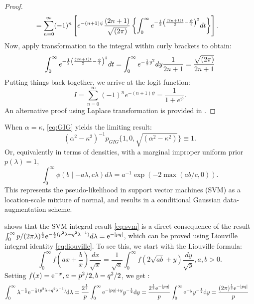 \documentclass[lineno]{biometrika}
\begin{document}
\begin{proof}
\begin{align*}
& = \sum_{n=0}^{\infty} (-1)^n \left[  e^{-(n+1)\psi} \frac{(2n+1)}{\sqrt{(2\pi)}} \left\{ \int_{0}^{\infty}e^{-\frac{1}{2} \left( \frac{(2n+1)t}{2} - \frac{\psi}{t}\right)^2 } dt \right\} \right].
\end{align*}
Now, apply \CS transformation to the integral within curly brackets to obtain: 
$$ 
\int_{0}^{\infty}e^{-\frac{1}{2} \left( \frac{(2n+1)t}{2} - \frac{\psi}{t}\right)^2 } dt = \int_0^{\infty} e^{-\frac{1}{2} y^2} dy \frac{1}{2n+1} = \frac{\sqrt{(2\pi)}}{2n+1}
$$
Putting things back together, we arrive at the logit function: 
$$
I = \sum_{n=0}^{\infty} (-1)^n e^{-(n+1)\psi} = \frac{1}{1+e^{\psi}}.
$$
An alternative proof using Laplace transformation is provided in \cite{polson2013bayesian}. 
\end{proof}
\begin{remark}
When $\alpha = \kappa$, \eqref{eq:GIG} yields the limiting result: 
$$
(\alpha^2-\kappa^2)^{-1}p_{GIG}\{ 1,0,\sqrt{(\alpha^2-\kappa^2)} \} \equiv 1.
$$
Or, equivalently in terms of densities, with a marginal improper uniform prior $p(\lambda) = 1$,
\begin{equation}
  \int_{0}^{\infty} \phi(b \mid -a\lambda, c\lambda) d\lambda = a^{-1} \exp(-2 \max(ab/c,0)). \label{eq:svm}
\end{equation}
This represents the pseudo-likelihood in support vector machines (SVM) as a location-scale mixture of normal, and results in a conditional Gaussian data-augmentation scheme. 
\end{remark}
\citet{polson2011data} shows that the SVM integral result \eqref{eq:svm} is a direct consequence of the \citet{andrews1974scale} result $\int_0^{\infty} p/(2\pi \lambda)^{\frac{1}{2}} {\rm e}^{-\frac{1}{2} (p^2 \lambda+q^2 \lambda^{-1})} d\lambda = {\rm e}^{-|pq|}$, which can be proved using Liouville integral identity \eqref{eq:liouville}. To see this, we start with the Liouville formula:
$$
\int_{0}^{\infty} f\left(ax + \frac{b}{x} \right) \frac{dx}{\sqrt{x}} = \frac{1}{\sqrt{a}} \int_{0}^{\infty} f \left( 2\sqrt{ab} + y \right) \frac{dy}{\sqrt{y}}, a,b >0. 
$$
Setting $f(x) = {\rm e}^{-x}, a = p^2/2, b = q^2/2$, we get :
\begin{align*}
\int_0^{\infty} \lambda^{-\frac{1}{2}} {\rm e}^{-\frac{1}{2}(p^2 \lambda + q^2 \lambda^{-1})} {\rm d} \lambda &= \frac{2^{\frac{1}{2}}}{p} \int_0^{\infty} {\rm e}^{-|pq| + y} y^{-\frac{1}{2}} {\rm d} y =  \frac{2^{\frac{1}{2}} {\rm e}^{-|pq|}}{p} \int_0^{\infty} {\rm e}^{-y} y^{-\frac{1}{2}} {\rm d} y = \frac{(2\pi)^{\frac{1}{2}} {\rm e}^{-|pq|}}{p} 
\end{align*}
\end{document}
